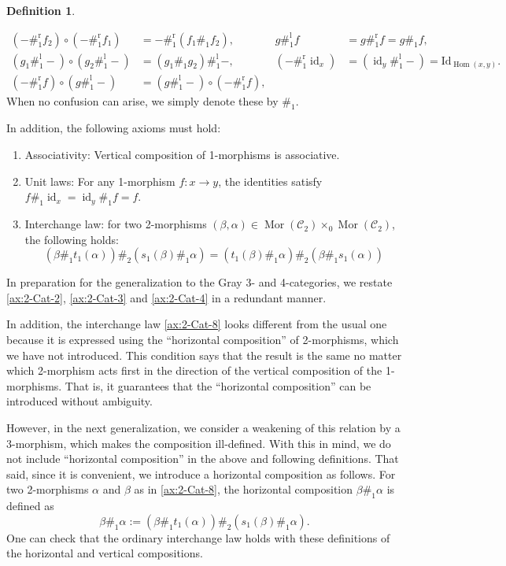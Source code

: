 \documentclass[11pt, reqno]{amsart} %
\newcommand{\mor}{{\mathop{\mathrm{Mor}}}}
\newcommand{\Hom}{{\mathop{\mathrm{Hom}}}}
\newcommand{\id}{{\mathop{\mathrm{id}}}}
\newcommand{\cC}{{\mathcal{C}}}
\theoremstyle{definition}
\newtheorem{definition}[theorem]{Definition}
\theoremstyle{remark}
\numberwithin{equation}{section}
\begin{document}
\begin{definition}
\begin{enumerate}
  \begin{align}
    \nonumber
    (-\#_1^{\text{r}}f_2)\circ (-\#_1^{\text{r}}f_1) &= -\#_1^{\text{r}}(f_1\#_1f_2), &
    g\#_1^{\text{l}}f &= g\#_1^{\text{r}}f = g\#_1f, \\
    \nonumber
    (g_1\#_1^{\text{l}}-)\circ (g_2\#_1^{\text{l}}-) &= (g_1\#_1g_2)\#_1^{\text{l}}-, & 
    (-\#_1^{\text{r}}\id_x) &= (\id_y\#_1^{\text{l}}-) = \text{Id}_{\Hom(x,y)}. \\
    \nonumber
    (-\#_1^{\text{r}}f)\circ (g\#_1^{\text{l}}-) &= (g\#_1^{\text{l}}-)\circ (-\#_1^{\text{r}}f), 
  \end{align}
  When no confusion can arise, we simply denote these by $\#_1$. 
\end{enumerate}
In addition, the following axioms must hold:
\begin{enumerate}
  \setcounter{enumi}{\thetemp}
  \item Associativity: Vertical composition of 1-morphisms is associative.
  \item Unit laws: For any 1-morphism $f:x\to y$, the identities satisfy $f\#_1\id_x = \id_y\#_1f = f$. 
  \item \label{ax:2-Cat-8} Interchange law: for two 2-morphisms $(\beta,\alpha)\in\mor(\cC_2)\times_0\mor(\cC_2)$, the following holds:
  \[
    (\beta\#_1t_1(\alpha))\#_2(s_1(\beta)\#_1\alpha) = (t_1(\beta)\#_1\alpha)\#_2(\beta\#_1s_1(\alpha))
  \]
\end{enumerate}
\end{definition}

In preparation for the generalization to the Gray 3- and 4-categories, we restate \ref{ax:2-Cat-2}, \ref{ax:2-Cat-3} and \ref{ax:2-Cat-4} in a redundant manner.

In addition, the interchange law \ref{ax:2-Cat-8} looks different from the usual one because it is expressed using the ``horizontal composition'' of 2-morphisms, which we have not introduced. This condition says that the result is the same no matter which 2-morphism acts first in the direction of the vertical composition of the 1-morphisms. That is, it guarantees that the ``horizontal composition'' can be introduced without ambiguity.

However, in the next generalization, we consider a weakening of this relation by a 3-morphism, which makes the composition ill-defined. With this in mind, we do not include ``horizontal composition'' in the above and following definitions. That said, since it is convenient, we introduce a horizontal composition as follows. For two 2-morphisms $\alpha$ and $\beta$ as in \ref{ax:2-Cat-8}, the horizontal composition $\beta\#_1\alpha$ is defined as
\[
  \beta\#_1\alpha := (\beta\#_1t_1(\alpha))\#_2(s_1(\beta)\#_1\alpha).
\]
One can check that the ordinary interchange law holds with these definitions of the horizontal and vertical compositions. 
\end{document}
